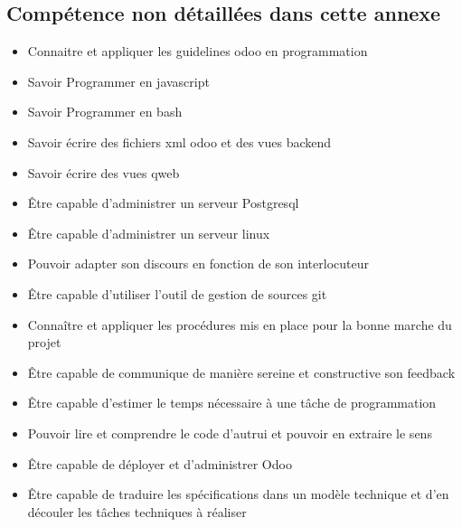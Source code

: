 \subsection{Compétence non détaillées dans cette annexe}
\begin{itemize}
 \item Connaitre et appliquer les guidelines odoo en programmation
 \item Savoir Programmer en javascript
 \item Savoir Programmer en bash
 \item Savoir écrire des fichiers xml odoo et des vues backend
 \item Savoir écrire des vues qweb
 \item Être capable d'administrer un serveur Postgresql
 \item Être capable d'administrer un serveur linux
 \item Pouvoir adapter son discours en fonction de son interlocuteur
 \item Être capable d'utiliser l'outil de gestion de sources git
 \item Connaître et appliquer les procédures mis en place pour la bonne marche du projet
 \item Être capable de communique de manière sereine et constructive son feedback
 \item Être capable d'estimer le temps nécessaire à une tâche de programmation
 \item Pouvoir lire et comprendre le code d'autrui et pouvoir en extraire le sens
 \item Être capable de déployer et d'administrer Odoo
 \item Être capable de traduire les spécifications dans un modèle technique et d'en découler les tâches techniques à réaliser
 
\end{itemize}


